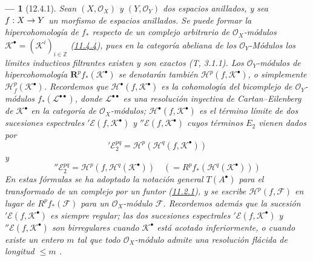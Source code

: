 \documentclass[10pt,oneside,openany]{book}
\theoremstyle{egaenv}\newtheorem*{env}{---}
\theoremstyle{egastatement}
\theoremstyle{egadescription}
\newcommand{\oldpage}[2][]{\marginnote{\normalfont\scriptsize\textbf{#1}\,|\,#2}\ignorespaces}
\renewcommand{\leq}{\leqslant}
\renewcommand{\to}{\mathchoice{\longrightarrow}{\rightarrow}{\rightarrow}{\rightarrow}}
\begin{document}
\begin{env}[12.4.1]
\label{0.12.4.1}
\label{0.12.4.1-fr}
Sean $(X,\mathcal O_X)$ y $(Y,\mathcal O_Y)$ dos espacios anillados, y sea
$f:X\to Y$ un morfismo de espacios anillados.
Se puede formar la hipercohomología de $f_*$ respecto de un complejo
\emph{arbitrario} de $\mathcal O_X$-módulos
$\mathcal K^\bullet=(\mathcal K^i)_{i\in\mathbb Z}$
(\hyperref[0.11.4.4-fr]{11.4.4}), pues en la categoría abeliana de los $\mathcal O_Y$-Módulos los límites inductivos filtrantes existen y son exactos (T, 3.1.1). Los $\mathcal O_Y$-módulos de hipercohomología
$\mathbf{R}^p f_*(\mathcal K^\bullet)$ se denotarán también
$\mathscr H^p(f,\mathcal K^\bullet)$, o simplemente
$\mathscr H_f^p(\mathcal K^\bullet)$.
Recordemos que $\mathscr H^\bullet(f,\mathcal K^\bullet)$ es la cohomología del
bicomplejo de $\mathcal O_Y$-módulos $f_*(\mathcal L^{\bullet\bullet})$,
donde $\mathcal L^{\bullet\bullet}$ es una resolución inyectiva de
Cartan--Eilenberg de $\mathcal K^\bullet$ en la categoría de
$\mathcal O_X$-módulos; $\mathscr H^\bullet(f,\mathcal K^\bullet)$ es el término límite de dos sucesiones espectrales ${}'\mathcal E(f,\mathcal K^\bullet)$ y ${}''\mathcal E(f,\mathcal K^\bullet)$ cuyos términos $E_2$
vienen dados por
\begin{equation}
\label{0.12.4.1.1-fr}
\tag{12.4.1.1}
{}'\mathcal E_2^{pq}=\mathcal H^p(\mathcal H^q(f,\mathcal K^\bullet))
\end{equation}
y
\begin{equation}
\label{0.12.4.1.2-fr}
\tag{12.4.1.2}
{}''\mathcal E_2^{pq}=\mathcal H^p(f,\mathcal H^q(\mathcal K^\bullet))
\quad(=R^p f_*(\mathcal H^q(\mathcal K^\bullet)))
\end{equation}
En estas fórmulas se ha adoptado la notación general $T(A^\bullet)$ para el transformado de un complejo por un funtor (\hyperref[0.11.2.1-fr]{11.2.1}), y se escribe
$\mathcal H^p(f,\mathcal F)$ en lugar de $R^p f_*(\mathcal F)$ para un $\mathcal O_X$-módulo $\mathcal F$. Recordemos además que la sucesión ${}'\mathcal E(f,\mathcal K^\bullet)$ es siempre \emph{regular}; las dos sucesiones espectrales ${}'\mathcal E(f,\mathcal K^\bullet)$ y ${}''\mathcal E(f,\mathcal K^\bullet)$ son \emph{birregulares} cuando $\mathcal K^\bullet$ está
acotado inferiormente,
\oldpage[0\textsubscript{III}]{63}
o cuando existe un entero $m$ tal que todo $\mathcal O_X$-módulo
admite una resolución flácida de longitud $\leq m$ .
\end{env}
\end{document}
